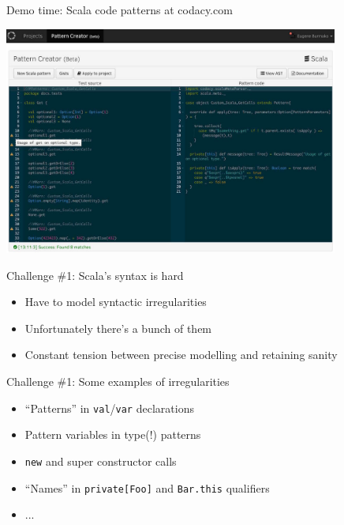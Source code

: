 \documentclass[svgnames,dvipsnames,hyperref={bookmarks=false},usepdftitle=false]{beamer}
\begin{document}
\begin{frame}[c, fragile]{Demo time: Scala code patterns at codacy.com}
\begin{center}
\includegraphics[height=7.5cm]{codacy.jpg}
\end{center}
\end{frame}

\begin{frame}{Challenge \#1: Scala's syntax is hard}
\begin{itemize}
\item Have to model syntactic irregularities
\item Unfortunately there's a bunch of them
\item Constant tension between precise modelling and retaining sanity
\end{itemize}
\end{frame}

\begin{frame}{Challenge \#1: Some examples of irregularities}
\begin{itemize}
\item ``Patterns'' in \texttt{val}/\texttt{var} declarations
\item Pattern variables in type(!) patterns
\item \texttt{new} and super constructor calls
\item ``Names'' in \texttt{private[Foo]} and \texttt{Bar.this} qualifiers
\item ...
\end{itemize}
\end{frame}
\end{document}
